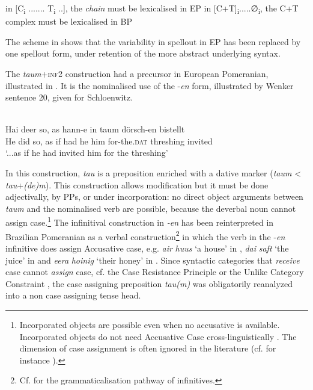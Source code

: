 \documentclass[output=paper,hidelinks,draftmode]{langscibook}
\begin{document}
\ea
\ea\label{ex:postma:6a} in [C\textsubscript{i} ....... T\textsubscript{i} ..], the \textit{chain} must be lexicalised in EP
\ex\label{ex:postma:6b} in [C+T]\textsubscript{i}.....∅\textsubscript{i}, the C+T complex must be lexicalised in BP\z\z

The scheme in  shows that the variability in spellout in EP has been replaced by one spellout form, under retention of the more abstract underlying syntax.

The \textit{taum}+\textsc{inf2} construction had a precursor in European Pomeranian, illustrated in . It is the nominalised use of the -\textit{en} form, illustrated by Wenker sentence 20, given for Schloenwitz.

\ea\label{ex:postma:7}
 \\
\gll Hai deer so, as hann-e in taum dörsch-en bistellt \\
     He did so, {as if} {had he} him for-the.\textsc{dat} threshing invited\\
\glt `...as if he had invited him for the threshing'\z

In this construction, \textit{tau} is a preposition enriched with a dative marker (\textit{taum} < \textit{tau}+\textit{(de)m}). This construction allows modification but it must be done adjectivally, by PPs, or under incorporation: no direct object arguments between \textit{taum} and the nominalised verb are possible, because the deverbal noun cannot assign case.\footnote{Incorporated objects are possible even when no accusative is available. Incorporated objects do not need Accusative Case cross-linguistically \citep{Baker1988}. The dimension of case assignment is often ignored in the literature (cf. for instance \citealt{Demske2011}).} The infinitival construction in \textit{{}-en} has been reinterpreted in Brazilian Pomeranian as a verbal construction\footnote{Cf. \citet{Haspelmath1989} for the grammaticalisation pathway of infinitives.} in which the verb in the -\textit{en} infinitive does assign Accusative case, e.g. \textit{air} \textit{huus} `a house' in , \textit{dai} \textit{saft} `the juice' in  and \textit{eera} \textit{hoinig} `their honey' in . Since syntactic categories that \textit{receive} case cannot \textit{assign} case, cf. the Case Resistance Principle \citep{Stowell1981} or the Unlike Category Constraint \citep{Hoekstra1984}, the case assigning preposition \textit{tau(m)} was obligatorily reanalyzed into a non case assigning tense head.
\end{document}
